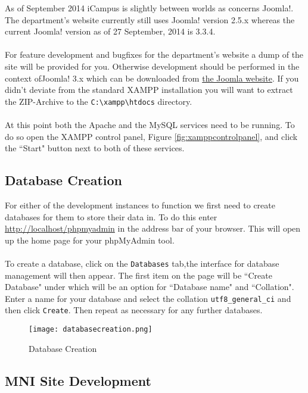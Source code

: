 \noindent
As of September 2014 iCampus is slightly between worlds as concerns Joomla!. The department's website currently still uses Joomla! version 2.5.x whereas the current Joomla! version as of 27 September, 2014 is 3.3.4.\\
\\
For feature development and bugfixes for the department's website a dump of the site will be provided for you. Otherwise development should be performed in the context ofJoomla! 3.x which can be downloaded from \href{http://www.joomla.org/download.html}{the Joomla website}. If you didn't deviate from the standard XAMPP installation you will want to extract the ZIP-Archive to the \texttt{C:\textbackslash xampp\textbackslash htdocs} directory.\\ 
\\
At this point both the Apache and the MySQL services need to be running. To do so open the XAMPP control panel, Figure \ref{fig:xamppcontrolpanel}, and click the ``Start" button next to both of these services.

\subsection{Database Creation}

For either of the development instances to function we first need to create databases for them to store their data in. To do this enter \url{http://localhost/phpmyadmin} in the address bar of your browser. This will open up the home page for your phpMyAdmin tool.\\
\\
To create a database, click on the \texttt{Databases} tab,the interface for database management will then appear. The first item on the page will be ``Create Database" under which will be an option for ``Database name" and ``Collation". Enter a name for your database and select the collation \texttt{utf8\_general\_ci} and then click \texttt{Create}. Then repeat as necessary for any further databases.\\

\begin{figure}[h] 
	\centering
	\texttt{[image: databasecreation.png]}
	\caption{Database Creation}
	\label{fig:databasecreation}
\end{figure}

\subsection{MNI Site Development}

